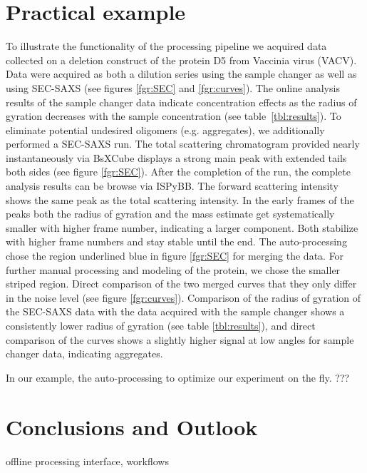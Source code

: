 \documentclass[preprint,pdf]{iucr}              %
\begin{document}
\section{Practical example}
To illustrate the functionality of the processing pipeline we acquired data collected 
on a deletion construct of the protein D5 from  Vaccinia virus (VACV). 
Data were acquired as both a dilution series using the sample changer as well as 
using SEC-SAXS (see figures \ref{fgr:SEC} and \ref{fgr:curves}). 
The online analysis results of the sample changer data indicate concentration effects 
as the radius of gyration decreases with the  sample concentration (see table~\ref{tbl:results}). 
To eliminate potential undesired oligomers (e.g. aggregates), we additionally performed a SEC-SAXS run.  
The total scattering chromatogram provided nearly instantaneously via BsXCube displays a strong main 
peak with extended tails both sides (see figure \ref{fgr:SEC}). 
After the completion of the run, the complete analysis results can be browse via
ISPyBB.
The forward scattering intensity shows the same peak as the total scattering intensity. 
In the early frames of the peaks both the radius of gyration and the mass estimate get systematically 
smaller with higher frame number, indicating a larger component.
Both stabilize with higher frame numbers and stay stable until the end.  
The auto-processing chose the region underlined blue in figure  \ref{fgr:SEC}
for merging the data.
For further manual processing and modeling of the protein, we chose the smaller
striped region.
Direct comparison of the two merged curves that they only differ in the noise level 
(see figure \ref{fgr:curves}). 
Comparison of the radius of gyration of the SEC-SAXS data with the data acquired with the sample 
changer shows a consistently lower radius of gyration (see table \ref{tbl:results}), and direct 
comparison of the curves shows a slightly higher signal at low angles for sample changer data, 
indicating aggregates.

In our example, the auto-processing to optimize our experiment on the fly. ???

\section{Conclusions and Outlook}
offline processing interface, workflows

\appendix
{}
\end{document}
